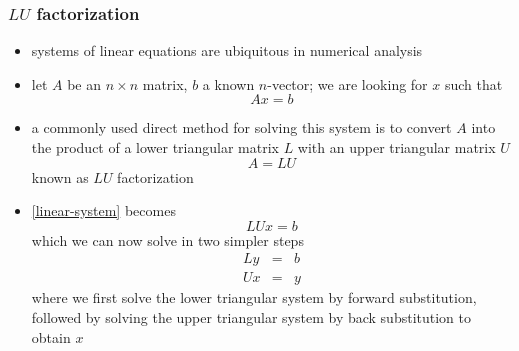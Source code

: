 \begin{frame}[fragile]
%
  \frametitle{$LU$ factorization}
%
  \begin{itemize}
%
  \item systems of linear equations are ubiquitous in numerical analysis
  \item let $A$ be an $n \times n$ matrix, $b$ a known $n$-vector; we are looking for $x$ such
    that
    \begin{equation}
      A x = b \label{eq:linear-system}
    \end{equation}
  \item a commonly used direct method for solving this system is to convert $A$ into the
    product of a lower triangular matrix $L$ with an upper triangular matrix $U$
    \begin{equation}
      A = L U \label{eq:LU-factorization}
    \end{equation}
    known as $LU$ factorization
  \item \eqref{linear-system} becomes
    \begin{equation}
      L U x = b
    \end{equation}
    which we can now solve in two simpler steps
    \begin{eqnarray}
        L y & = & b \\
        U x & = & y
    \end{eqnarray}
    where we first solve the lower triangular system by forward substitution, followed by
    solving the upper triangular system by back substitution to obtain $x$
%
  \end{itemize}
%
\end{frame}

